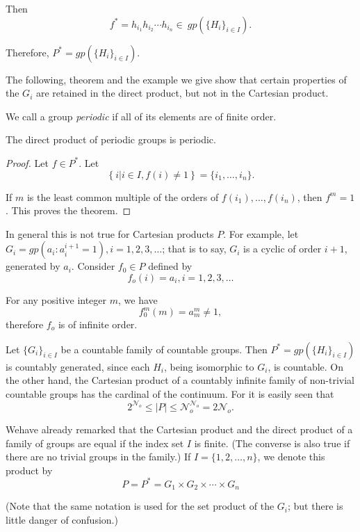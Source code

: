 Then
$$
f^* = h_{i_1} h_{i_2} \cdots h_{i_n} \in  ~gp ( \{ H_i \}_{i \in  I}).
$$

Therefore, $P^*= gp ( \{ H_i\}_{i \in  I})$.

The following, theorem and the example we give show that certain
properties of the $G_i$ are retained in the direct product, but not in
the Cartesian product. 

We call a group \textit{ periodic } if all of its elements are of
finite order.\pageoriginale
 
\setcounter{theorem}{0}
\begin{theorem}\label{chap6:sec1:thm1} %
  The direct product of periodic groups is periodic.
\end{theorem}

\begin{proof}
  Let $f \in  P^*$. Let 
  $$
  \left\{ i \bigg| i \in  I, f(i) \neq 1 \right\}= \bigg\{ i_1,
  \ldots,  i_n \bigg\}. 
  $$

  If $m$ is the least common multiple of the orders of $f(i_1), \ldots, 
  f(i_n)$, then $f^m=1$. This proves the theorem. 
\end{proof}

In general this is not true for Cartesian products $P$. For example,
let $G_i= gp(a_i : a^{i+1}_i =1), i=1, 2, 3, \ldots $; that is to say,
$G_i$ is a cyclic of order $i+1$, generated by $a_i$. Consider $f_0
\in  P$ defined by   
$$
f_o(i) = a_i, i = 1,2,3, \ldots
$$

For any positive integer $m$, we have 
$$
f^m_0(m)= a_m^m \neq 1,
$$
therefore $f_o$ is of infinite order.

Let $\{ G_i \}_{i \in  I}$ be a countable family of countable
groups. Then $P^* = gp( \{ H_i\}_{i \in  I})$ is countably
generated, since each $H_i$, being isomorphic to $G_i$, is
countable. On the other hand, the Cartesian product of a countably
infinite family of non-trivial countable groups has the cardinal of the
continuum. For it is easily seen that  
$$
2^ {\mathscr{N}_o} \le |P| \le  \mathscr{N}_o^{\mathscr{N}_o}=
2{\mathscr{N}_o}.  
$$

We\pageoriginale have already remarked that the Cartesian product and the direct
product of a family of groups are equal if the index set $I$ is
finite. (The converse is also true if there are no trivial groups in
the family.) If $I= \{ 1,2, \ldots,  n\}$, we denote this product by   
$$
P = P^* = G_1 \times G_2 \times \cdots \times G_n
$$

(Note that the same notation is used for the set product of the
$G_i$; but there is little danger of confusion.) 


